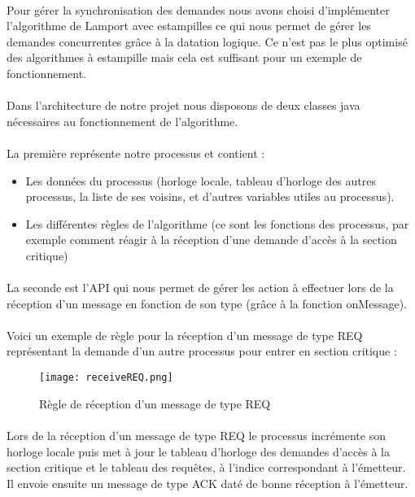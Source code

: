 \documentclass[a4paper,10pt]{report}
\begin{document}
\paragraph{}
Pour gérer la synchronisation des demandes nous avons choisi d'implémenter l'algorithme de Lamport avec estampilles ce qui nous permet de gérer les demandes concurrentes grâce à la datation logique. Ce n'est pas le plus optimisé des algorithmes à estampille mais cela est suffisant pour un exemple de fonctionnement.
\paragraph{}
Dans l'architecture de notre projet nous disposons de deux classes java nécessaires au fonctionnement de l'algorithme.
\paragraph{}
La première représente notre processus et contient :
\newline
\begin{itemize}
    \item Les données du processus (horloge locale, tableau d'horloge des autres processus, la liste de ses voisins, et d'autres variables utiles au processus).
    \newline
    \item Les différentes règles de l'algorithme (ce sont les fonctions des processus, par exemple comment réagir à la réception d'une demande d'accès à la section critique)
\end{itemize}
\paragraph{}
La seconde est l'API qui nous permet de gérer les action à effectuer lors de la réception d'un message en fonction de son type (grâce à la fonction onMessage).
\newpage
\paragraph{}
Voici un exemple de règle pour la réception d'un message de type REQ représentant la demande d'un autre processus pour entrer en section critique :
\begin{figure}[h]
    \centering
    \texttt{[image: receiveREQ.png]}
    \caption{Règle de réception d'un message de type REQ}
\end{figure}


\paragraph{}
Lors de la réception d'un message de type REQ le processus incrémente son horloge locale puis met à jour le tableau d'horloge des demandes d'accès à la section critique et le tableau des requêtes, à l'indice correspondant à l'émetteur. Il envoie ensuite un message de type ACK daté de bonne réception à l'émetteur.
\newpage
\end{document}
